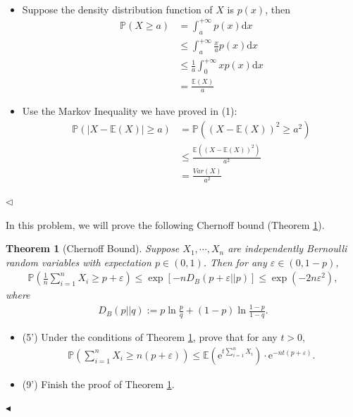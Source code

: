 \documentclass[11pt]{article}
\newtheorem{theorem}{Theorem}
\newenvironment{problem}[2][Problem]{\begin{trivlist}
\item[\hskip \labelsep {\bfseries #1}\hskip \labelsep {\bfseries #2.}]}{\hfill$\blacktriangleleft$\end{trivlist}}
\newenvironment{answer}[1][Answer]{\begin{trivlist}
\item[\hskip \labelsep {\bfseries #1.}\hskip \labelsep]}{\hfill$\lhd$\end{trivlist}}
\newcommand\E{\mathbb{E}}
\newcommand\dd{\mathrm{d}}
\begin{document}
\begin{answer} ~
\begin{itemize}
    \item [(1)] Suppose the density distribution function of $X$ is $p(x)$, then
    \[\begin{aligned}
        \mathbb{P}(X \ge a) &= \int_a^{+\infty} p(x) \dd x \\
        &\le \int_a^{+\infty} \frac{x}{a} p(x) \dd x \\
        &\le \frac{1}{a} \int_0^{+\infty} xp(x) \dd x \\
        &= \frac{\E(X)}{a} 
    \end{aligned}\]
    \item [(2)] Use the Markov Inequality we have proved in (1):
    \[\begin{aligned}
        \mathbb{P}(|X - \E(X)| \ge a) &= \mathbb{P}((X - \E(X))^2 \ge a^2) \\
        &\le \frac{\E((X - \E(X))^2)}{a^2} \\
        &= \frac{Var(X)}{a^2}
    \end{aligned}\]
\end{itemize}
\end{answer}



\begin{problem}{4 (14')}
In this problem, we will prove the following Chernoff bound (Theorem \ref*{thm:chernoff}).
\begin{theorem}[Chernoff Bound]
\label{thm:chernoff}
    Suppose $X_1,\cdots,X_n$ are independently Bernoulli random variables with expectation $p\in(0,1)$. Then for any $\varepsilon\in(0,1-p)$,
    \begin{align*}
        \mathbb{P}\left(\frac{1}{n}\sum_{i=1}^n X_i\geq p+\varepsilon\right)\leq \exp\left[-nD_B(p+\varepsilon||p)\right] \leq \exp(-2n\varepsilon^2),
    \end{align*} 
where 
\begin{align*}
    D_B(p||q):=p\ln\frac{p}{q}+(1-p)\ln\frac{1-p}{1-q}.
\end{align*}
\end{theorem}
\begin{itemize}
    \item [(1)] (5') Under the conditions of Theorem \ref*{thm:chernoff}, prove that for any $t>0$,
    \begin{align*}
        \mathbb{P}\left(\sum_{i=1}^n X_i\geq n(p+\varepsilon)\right)\leq\mathbb{E}\left(\mathrm{e}^{t\sum_{i=1}^n X_i}\right)\cdot\mathrm{e}^{-nt(p+\varepsilon)}.
    \end{align*}
    \item [(2)] (9') Finish the proof of Theorem \ref*{thm:chernoff}.
\end{itemize}
\end{problem}
\end{document}

